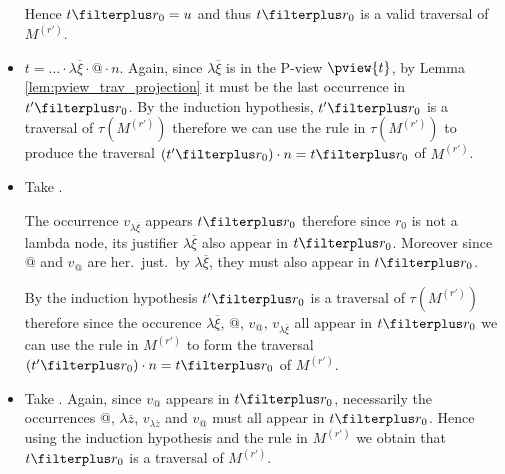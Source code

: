 \begin{itemize}
        Hence $t \filterplus r_0 = u$ and thus $t \filterplus r_0$ is a valid traversal of $M^{(r')}$.

    \item {} $t = \ldots \cdot \lambda \overline{\xi} \cdot @ \cdot n$.
        Again, since $\lambda \overline{\xi}$ is in the P-view
        $\pview{t}$, by Lemma \ref{lem:pview_trav_projection} it
        must be the last occurrence in $t'\filterplus r_0$. By
        the induction hypothesis, $t' \filterplus r_0$ is a
        traversal of $\tau(M^{(r')})$ therefore we can use the
        rule  in $\tau(M^{(r')})$ to produce the
        traversal $(t'\filterplus r_0) \cdot n = t \filterplus
        r_0$ of $M^{(r')}$.


    \item {} Take .

        The occurrence $v_{\lambda \overline{\xi}}$ appears
        $t\filterplus r_0$ therefore since $r_0$ is not a lambda
        node, its justifier $\lambda \overline{\xi}$ also appear in
        $t\filterplus r_0$. Moreover since $@$ and $v_@$ are her.\
        just.\ by $\lambda \overline{\xi}$, they must also appear in
        $t\filterplus r_0$.

        By the induction hypothesis $t' \filterplus r_0$ is a
        traversal of $\tau(M^{(r')})$ therefore since the occurence
        $\lambda \overline{\xi}$, @, $v_@$, $v_{\lambda
        \overline{\xi}}$ all appear in $t\filterplus r_0$ we can use
        the rule \rulenamet{Value$^{@\mapsto\lambda}$} in $M^{(r')}$
        to form the traversal $(t'\filterplus r_0) \cdot n = t
        \filterplus r_0$ of $M^{(r')}$.

    \item {}
          Take . Again, since $v_@$ appears in $t
        \filterplus r_0$, necessarily the occurrences @, $\lambda
        \overline{z}$, $v_{\lambda \overline{z}}$ and $v_@$ must all
        appear in $t \filterplus r_0$. Hence using the induction
        hypothesis and the rule
         in $M^{(r')}$ we
        obtain that $t \filterplus r_0$ is a traversal of
        $M^{(r')}$.


\end{itemize}
